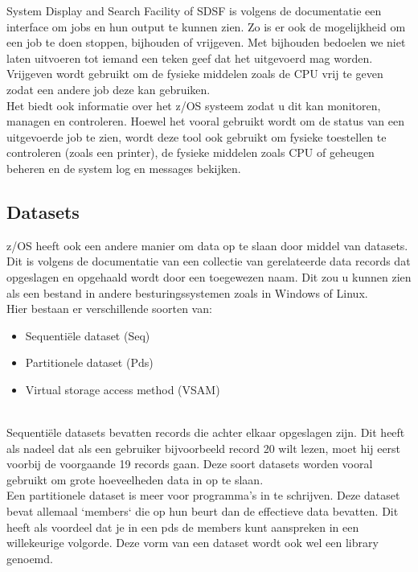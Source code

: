 System Display and Search Facility of SDSF is volgens de \textcite{IBM2023} documentatie een interface om jobs en hun output te kunnen zien. Zo is er ook de mogelijkheid om een job te doen stoppen, bijhouden of vrijgeven. Met bijhouden bedoelen we niet laten uitvoeren tot iemand een teken geef dat het uitgevoerd mag worden. Vrijgeven wordt gebruikt om de fysieke middelen zoals de CPU vrij te geven zodat een andere job deze kan gebruiken. \\ 
Het biedt ook informatie over het z/OS systeem zodat u dit kan monitoren, managen en controleren. Hoewel het vooral gebruikt wordt om de status van een uitgevoerde job te zien, wordt deze tool ook gebruikt om fysieke toestellen te controleren (zoals een printer), de fysieke middelen zoals CPU of geheugen beheren en de system log en messages bekijken.

\subsection{Datasets}
z/OS heeft ook een andere manier om data op te slaan door middel van datasets. Dit is volgens de documentatie van \textcite{IBM} een collectie van gerelateerde data records dat opgeslagen en opgehaald wordt door een toegewezen naam. Dit zou u kunnen zien als een bestand in andere besturingssystemen zoals in Windows of Linux. \\

Hier bestaan er verschillende soorten van:

\begin{itemize}
    \item Sequentiële dataset (Seq)
    \item Partitionele dataset (Pds)
    \item Virtual storage access method (VSAM)
\end{itemize} \\

Sequentiële datasets bevatten records die achter elkaar opgeslagen zijn. Dit heeft als nadeel dat als een gebruiker bijvoorbeeld record 20 wilt lezen, moet hij eerst voorbij de voorgaande 19 records gaan. Deze soort datasets worden vooral gebruikt om grote hoeveelheden data in op te slaan. \autocite{IBM} \\

Een partitionele dataset is meer voor programma's in te schrijven. Deze dataset bevat allemaal `members` die op hun beurt dan de effectieve data bevatten. Dit heeft als voordeel dat je in een pds de members kunt aanspreken in een willekeurige volgorde. Deze vorm van een dataset wordt ook wel een library genoemd. \autocite{IBM} \\

